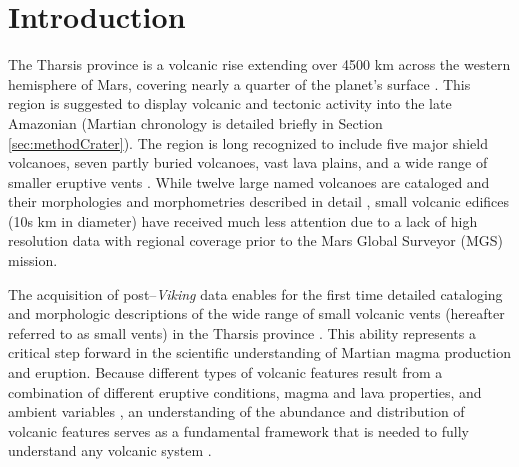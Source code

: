 \documentclass[preprint,review,authoryear,12pt]{elsarticle}
\begin{document}
\linenumbers

\section{Introduction}
\label{sec-intro}

The Tharsis province is a volcanic rise extending over 4500 km across the western hemisphere of Mars, covering nearly a quarter of the planet's surface \citep{Hodges1994}. This region is suggested to display volcanic and tectonic activity into the late Amazonian \citep{Anderson2001,Neukum2004} (Martian chronology is detailed briefly in Section \ref{sec:methodCrater}). The region is long recognized to include five major shield volcanoes, seven partly buried volcanoes, vast lava plains, and a wide range of smaller eruptive vents \citep{Carr1977,Greeley1981,MouginisMark1992,Hodges1994}. While twelve large named volcanoes are cataloged and their morphologies and morphometries described in detail \citep[][and references therein]{Hodges1994,Plescia2004}, small volcanic edifices (10s km in diameter) have received much less attention due to a lack of high resolution data with regional coverage prior to the Mars Global Surveyor (MGS) mission.

The acquisition of post--\textit{Viking} data enables for the first time detailed cataloging and morphologic descriptions of the wide range of small volcanic vents (hereafter referred to as small vents) in the Tharsis province \citep{Baptista2008,Baratoux2009,Bleacher2007,Bleacher2009,Broz2012,Hauber2009,Hauber2011,Keszthelyi2008,Wilson2009}. This ability represents a critical step forward in the scientific understanding of Martian magma production and eruption. Because different types of volcanic features result from a combination of different eruptive conditions, magma and lava properties, and ambient variables \citep{Greeley1977,WhitfordStark1982}, an understanding of the abundance and distribution of volcanic features serves as a fundamental framework that is needed to fully understand any volcanic system \citep{Head1981,Connor2000}.
\end{document}
